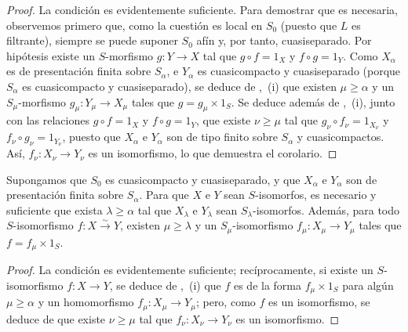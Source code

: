 \begin{proof}
La condición es evidentemente suficiente. Para demostrar que es necesaria, observemos primero que, como la cuestión es local en $S_0$ (puesto que $L$ es filtrante), siempre se puede suponer $S_0$ afín y, por tanto, cuasiseparado. Por hipótesis existe un $S$-morfismo $g:Y\to X$ tal que $g\circ f=1_X$ y $f\circ g=1_Y$. Como $X_\alpha$ es de presentación finita sobre $S_\alpha$, e $Y_\alpha$ es cuasicompacto y cuasiseparado (porque $S_\alpha$ es cuasicompacto y cuasiseparado), se deduce de ,~(i) que existen $\mu\geq\alpha$ y un $S_\mu$-morfismo $g_\mu:Y_\mu\to X_\mu$ tales que $g=g_\mu\times1_S$. Se deduce además de ,~(i), junto con las relaciones $g\circ f=1_X$ y $f\circ g=1_Y$, que existe $\nu\geq\mu$ tal que $g_\nu\circ f_\nu=1_{X_\nu}$ y $f_\nu\circ g_\nu=1_{Y_\nu}$, puesto que $X_\alpha$ e $Y_\alpha$ son de tipo finito sobre $S_\alpha$ y cuasicompactos. Así, $f_\nu:X_\nu\to Y_\nu$ es un isomorfismo, lo que demuestra el corolario.
\end{proof}

\begin{corollary}[8.8.2.5]
\label{IV.8.8.2.5-fr}
Supongamos que $S_0$ es cuasicompacto y cuasiseparado, y que $X_\alpha$ e $Y_\alpha$ son de presentación finita sobre $S_\alpha$.
Para que $X$ e $Y$ sean $S$-isomorfos, es necesario y suficiente que exista $\lambda\geq\alpha$ tal que $X_\lambda$ e $Y_\lambda$ sean $S_\lambda$-isomorfos. Además, para todo $S$-isomorfismo $f:X\xrightarrow{\sim}Y$, existen $\mu\geq\lambda$ y un $S_\mu$-isomorfismo $f_\mu:X_\mu\to Y_\mu$ tales que $f=f_\mu\times1_S$.
\end{corollary}

\begin{proof}
La condición es evidentemente suficiente; recíprocamente, si existe un $S$-isomorfismo $f:X\to Y$, se deduce de ,~(i) que $f$ es de la forma $f_\mu\times1_S$ para algún $\mu\geq\alpha$ y un homomorfismo $f_\mu:X_\mu\to Y_\mu$; pero, como $f$ es un isomorfismo, se deduce de  que existe $\nu\geq\mu$ tal que $f_\nu:X_\nu\to Y_\nu$ es un isomorfismo.
\end{proof}

